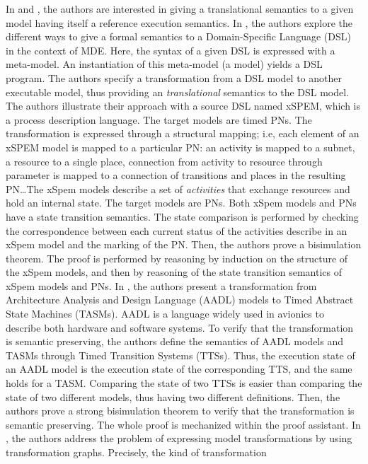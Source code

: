 \documentclass[pdflatex,sn-mathphys]{sn-jnl}%
\theoremstyle{thmstyleone}%
\theoremstyle{thmstyletwo}%
\theoremstyle{thmstylethree}%
\begin{document}
In \cite{Combemale2009} and \cite{Yang2014}, the authors are
interested in giving a translational semantics to a given model having
itself a reference execution semantics.  In \cite{Combemale2009}, the
authors explore the different ways to give a formal semantics to a
Domain-Specific Language (DSL) in the context of MDE. Here, the syntax
of a given DSL is expressed with a meta-model.  An instantiation of
this meta-model (a model) yields a DSL program. The authors specify a
transformation from a DSL model to another executable model, thus
providing an \textit{translational} semantics to the DSL model.  The
authors illustrate their approach with a source DSL named xSPEM, which
is a process description language. The target models are timed
PNs. The transformation is expressed through a structural mapping;
i.e, each element of an xSPEM model is mapped to a particular PN: an
activity is mapped to a subnet, a resource to a single place,
connection from activity to resource through parameter is mapped to a
connection of transitions and places in the resulting PN\dots The
xSpem models describe a set of \emph{activities} that exchange
resources and hold an internal state. The target models are PNs. Both
xSpem models and PNs have a state transition semantics. The state
comparison is performed by checking the correspondence between each
current status of the activities describe in an xSpem model and the
marking of the PN. Then, the authors prove a bisimulation theorem.
The proof is performed by reasoning by induction on the structure of
the xSpem models, and then by reasoning of the state transition
semantics of xSpem models and PNs.  In \cite{Yang2014}, the authors
present a transformation from Architecture Analysis and Design
Language (AADL) models to Timed Abstract State Machines (TASMs). AADL
is a language widely used in avionics to describe both hardware and
software systems.  To verify that the transformation is semantic
preserving, the authors define the semantics of AADL models and TASMs
through Timed Transition Systems (TTSs). Thus, the execution state of
an AADL model is the execution state of the corresponding TTS, and the
same holds for a TASM. Comparing the state of two TTSs is easier than
comparing the state of two different models, thus having two different
definitions. Then, the authors prove a strong bisimulation theorem to
verify that the transformation is semantic preserving. The whole proof
is mechanized within the \coq{} proof assistant.  In \cite{Dyck2019},
the authors address the problem of expressing model transformations by
using transformation graphs. Precisely, the kind of transformation
\end{document}
